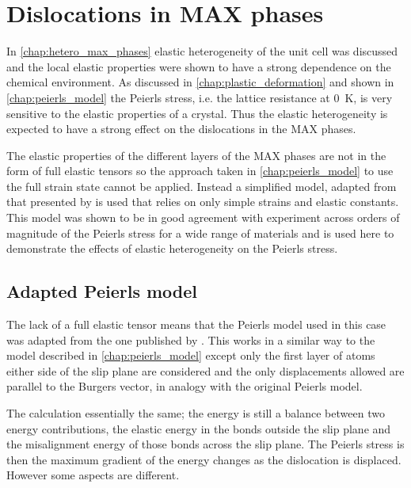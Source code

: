 
\chapter{Dislocations in MAX phases}

\label{chap:dislocations_in_max_phases}
\graphicspath{{dislocations_in_max_phases/Figs/}}






In \autoref{chap:hetero_max_phases} elastic heterogeneity of the unit cell was discussed and the local elastic properties were shown to have a strong dependence on the chemical environment. As discussed in  \autoref{chap:plastic_deformation} and shown in \autoref{chap:peierls_model} the Peierls stress, i.e. the lattice resistance at \SI{0}{\kelvin}, is very sensitive to the elastic properties of a crystal. Thus the elastic heterogeneity is expected to have a strong effect on the dislocations in the MAX phases.

The elastic properties of the different layers of the MAX phases are not in the form of full elastic tensors so the approach taken in \autoref{chap:peierls_model} to use the full strain state cannot be applied. Instead a simplified model, adapted from that presented by \citet{Clegg2006} is used that relies on only simple strains and elastic constants. This model was shown to be in good agreement with experiment across orders of magnitude of the Peierls stress for a wide range of materials and is used here to demonstrate the effects of elastic heterogeneity on the Peierls stress.


\section{Adapted Peierls model}

The lack of a full elastic tensor means that the Peierls model used in this case was adapted from the one published by \cite{Clegg2006}. This works in a similar way to the model described in \autoref{chap:peierls_model} except only the first layer of atoms either side of the slip plane are considered and the only displacements allowed are parallel to the Burgers vector, in analogy with the original Peierls model.

The calculation essentially the same; the energy is still a balance between two energy contributions, the elastic energy in the bonds outside the slip plane and the misalignment energy of those bonds across the slip plane. The Peierls stress is then the maximum gradient of the energy changes as the dislocation is displaced. However some aspects are different.


